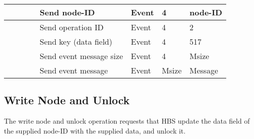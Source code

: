\begin{tabular}{|p{1.2in}|p{.4in}|p{.4in}|p{.5in}|p{1.2in}|p{.4in}|p{.4in}|p{.5in} |}
                  &        &       &       & Send node-ID  & Event  &   4   &   node-ID    \\  \hline
                  &        &       &       & Send operation 
                                             ID           & Event  &   4   &  2   \\ \hline
                  &        &       &       & Send key (data field)    & Event  &   4   &  517    \\ \hline
                  &        &       &       & Send event message
                                                  size    & Event  &   4   &  Msize \\ \hline
                  &        &       &       & Send event message
                                                          & Event  &  Msize&  Message  \\ \hline
\end{tabular}
\normalsize
\bigskip




\newpage
\subsection{Write Node and Unlock}

The write node and unlock operation requests that HBS update the data field of the supplied node-ID with the supplied data, and  unlock it.

